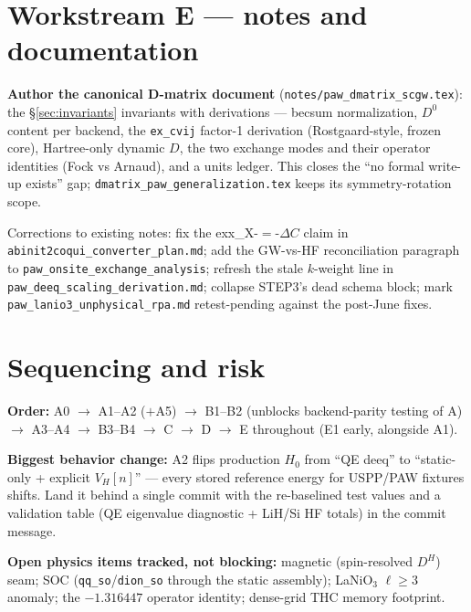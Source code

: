 \documentclass[11pt]{article}
\newcommand{\code}[1]{\texttt{\small #1}}
\newcommand{\file}[1]{\texttt{\small #1}}
\begin{document}
\section{Workstream E --- notes and documentation}
\label{sec:wsE}

\begin{description}[leftmargin=2.6em,style=nextline]
\item[E1.] \textbf{Author the canonical D-matrix document}
(\file{notes/paw\_dmatrix\_scgw.tex}): the \S\ref{sec:invariants}
invariants with derivations --- becsum normalization, $D^0$ content per
backend, the \code{ex\_cvij} factor-1 derivation (Rostgaard-style, frozen
core), Hartree-only dynamic $D$, the two exchange modes and their operator
identities (Fock vs Arnaud), and a units ledger. This closes the ``no
formal write-up exists'' gap; \file{dmatrix\_paw\_generalization.tex} keeps
its symmetry-rotation scope.

\item[E2.] Corrections to existing notes: fix the
exx\_X-$=$-$\Delta C$ claim in \file{abinit2coqui\_converter\_plan.md}; add
the GW-vs-HF reconciliation paragraph to
\file{paw\_onsite\_exchange\_analysis}; refresh the stale $k$-weight line
in \file{paw\_deeq\_scaling\_derivation.md}; collapse STEP3's dead schema
block; mark \file{paw\_lanio3\_unphysical\_rpa.md} retest-pending against
the post-June fixes.
\end{description}

\section{Sequencing and risk}
\label{sec:seq}

\textbf{Order:} A0 $\to$ A1--A2 ($+$A5) $\to$ B1--B2 (unblocks
backend-parity testing of A) $\to$ A3--A4 $\to$ B3--B4 $\to$ C $\to$ D
$\to$ E throughout (E1 early, alongside A1).

\textbf{Biggest behavior change:} A2 flips production $H_0$ from ``QE
deeq'' to ``static-only + explicit $V_H[n]$'' --- every stored reference
energy for USPP/PAW fixtures shifts. Land it behind a single commit with
the re-baselined test values and a validation table (QE eigenvalue
diagnostic + LiH/Si HF totals) in the commit message.

\textbf{Open physics items tracked, not blocking:} magnetic (spin-resolved
$D^H$) seam; SOC (\code{qq\_so}/\code{dion\_so} through the static
assembly); LaNiO$_3$ $\ell \ge 3$ anomaly; the $-1.316447$ operator
identity; dense-grid THC memory footprint.
\end{document}
